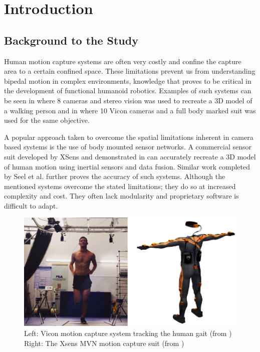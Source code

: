 \chapter{Introduction}

\section{Background to the Study}
Human motion capture systems are often very costly and confine the capture area to a certain confined space. These limitations prevent us from understanding bipedal motion in complex environments, knowledge that proves to be critical in the development of functional humanoid robotics. Examples of such systems can be seen in \cite{sandau2014markerless} where 8 cameras and stereo vision was used to recreate a 3D model of a walking person and in \cite{pfister2014comparative} where 10 Vicon cameras and a full body marked suit was used for the same objective.

A popular approach taken to overcome the spatial limitations inherent in camera based systems is the use of body mounted sensor networks. A commercial sensor suit developed by XSens and demonstrated in \cite{roetenberg2009xsens} can accurately recreate a 3D model of human motion using inertial sensors and data fusion. Similar work completed by Seel et al. \cite{seel2014imu} further proves the accuracy of such systems. Although the mentioned systems overcome the stated limitations; they do so at increased complexity and cost. They often lack modularity and proprietary software is difficult to adapt.

\begin{figure}[!ht] 
\captionsetup{width=0.8\linewidth, font=small}  
\includegraphics[width=0.8\linewidth]{figures/COMBO.png}
\caption{Left: Vicon motion capture system tracking the human gait (from \cite{roetenberg2009xsens}) Right: The Xsens MVN motion capture suit (from \cite{vicon})}
\label{fig:COMBO}
\end{figure}

